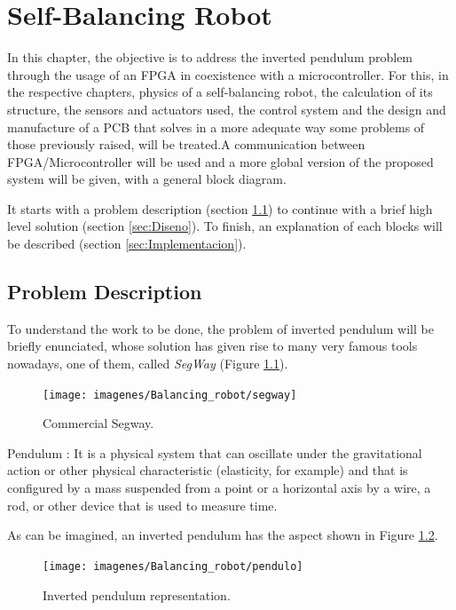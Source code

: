 \chapter{Self-Balancing Robot}\label{sec: BalancingRobot}
In this chapter, the objective is to address the inverted pendulum problem through the usage of an FPGA in coexistence with a microcontroller. For this, in the respective chapters, physics of a self-balancing robot, the calculation of its structure, the sensors and actuators used, the control system and the design and manufacture of a PCB that solves in a more adequate way some problems of those previously raised, will be treated.A communication between FPGA/Microcontroller will be used and a more global version of the proposed system will be given, with a general block diagram. \newline

It starts with a problem description (section \ref{sec:Descripcion_balancin}) to continue with a brief high level solution (section \ref{sec:Diseno}). To finish, an explanation of each blocks will be described (section \ref{sec:Implementacion}).

\section{Problem Description} \label{sec:Descripcion_balancin}

To understand the work to be done, the problem of inverted pendulum will be briefly enunciated, whose solution has given rise to many very famous tools nowadays, one of them, called \textit{SegWay} (Figure \ref{fig:segway}).

\begin{figure}[H]
	\center
	\texttt{[image: imagenes/Balancing\_robot/segway]}
	\caption{Commercial Segway.}
	\label{fig:segway}
\end{figure}


\begin{definicion}Pendulum \cite{Pendulum}: It is a physical system that can oscillate under the gravitational action or other physical characteristic (elasticity, for example) and that is configured by a mass suspended from a point or a horizontal axis by a wire, a rod, or other device that is used to measure time. \newline
\end{definicion}
As can be imagined, an inverted pendulum has the aspect shown in Figure \ref{fig:pendulo}. 

\begin{figure}[H]
	\center
	\texttt{[image: imagenes/Balancing\_robot/pendulo]}
	\caption{Inverted pendulum representation.}
	\label{fig:pendulo}
\end{figure}

